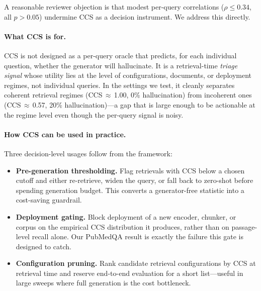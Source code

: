 A reasonable reviewer objection is that modest per-query correlations
($\rho \leq 0.34$, all $p > 0.05$) undermine CCS as a decision instrument.
We address this directly.



\paragraph{What CCS is for.}
CCS is not designed as a per-query oracle that predicts, for each
individual question, whether the generator will hallucinate. It is a
retrieval-time \emph{triage signal} whose utility lies at the level of
configurations, documents, or deployment regimes, not individual queries.
In the settings we test, it cleanly separates coherent retrieval regimes
(CCS$\,\approx\,$1.00, 0\% hallucination) from incoherent ones
(CCS$\,\approx\,$0.57, 20\% hallucination)---a gap that is large enough to
be actionable at the regime level even though the per-query signal is
noisy.

\paragraph{How CCS can be used in practice.}
Three decision-level usages follow from the framework:
\begin{itemize}
  \item \textbf{Pre-generation thresholding.} Flag retrievals with
        CCS below a chosen cutoff and either re-retrieve, widen the
        query, or fall back to zero-shot before spending generation
        budget. This converts a generator-free statistic into a
        cost-saving guardrail.
  \item \textbf{Deployment gating.} Block deployment of a new encoder,
        chunker, or corpus on the empirical CCS distribution it produces,
        rather than on passage-level recall alone. Our PubMedQA result is
        exactly the failure this gate is designed to catch.
  \item \textbf{Configuration pruning.} Rank candidate retrieval
        configurations by CCS at retrieval time and reserve end-to-end
        evaluation for a short list---useful in large sweeps where full
        generation is the cost bottleneck.
\end{itemize}

